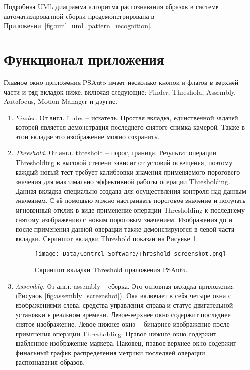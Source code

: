 Подробная UML диаграмма алгоритма распознавания образов в системе автоматизированной сборки продемонстрирована в Приложении~\ref{fig:uml_uml_pattern_recognition}.

\section{Функционал приложения}

Главное окно приложения PSAuto имеет несколько кнопок и флагов в верхней части и ряд вкладок ниже, включая следующие: Finder, Threshold, Assembly, Autofocus, Motion Manager и другие.

\begin{enumerate}

\item \emph{Finder.} От англ. finder -- искатель. Простая вкладка, единственной задачей которой является демонстрация последнего снятого снимка камерой. Также в этой вкладке это изображение можно сохранить.

\item \emph{Threshold.} От англ. threshold -- порог, граница. Результат операции Thresholding в высокой степени зависит от условий освещения, поэтому каждый новый тест требует калибровки значения применяемого порогового значения для максимально эффективной работы операции Thresholding. Данная вкладка специально создана для осуществления контроля над данным значением. С её помощью можно настраивать пороговое значение и получать мгновенный отклик в виде применение операции Thresholding к последнему снятому изображению с новым пороговым значением. Изображения до и после применения данной операции также демонстируются в левой части вкладки. Скриншот вкладки Threshold показан на Рисунке \ref{fig:threshold_screenshot}.

\begin{figure}[ht]\centering
\texttt{[image: Data/Control\_Software/Threshold\_screenshot.png]}
\caption{Скриншот вкладки Threshold приложения PSAuto.}
\label{fig:threshold_screenshot}
\end{figure}

\item \emph{Assembly.} От англ. assembly -- cборка. Это основная вкладка приложения (Рисунок \ref{fig:assembly_screenshot}). Она включает в себя четыре окна с изображениями слева, средства управления справа и статус двигательной установки в реальном времени. Левое-верхнее окно содержит последнее снятое изображение. Левое-нижнее окно -- бинарное изображение после применения операции Thresholding. Правое нижнее окно содержит шаблонное изображение маркера. Наконец, правое-верхнее окно содержит финальный график распределения метрики последней операции распознавания образов.


\end{enumerate}
